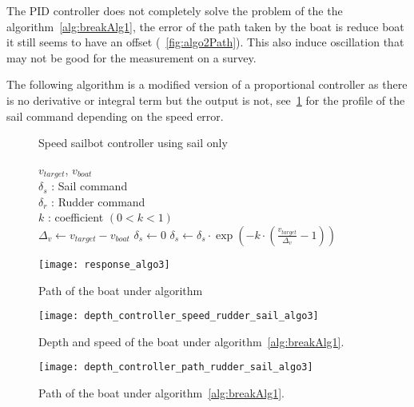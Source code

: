 The PID controller does not completely solve the problem of the the algorithm~\ref{alg:breakAlg1}, the error of the path taken by the boat is reduce boat  it still seems to have an offset (~\ref{fig:algo2Path}). This also induce oscillation that may not be good for the measurement on a survey.

The following algorithm is a modified version of a proportional controller as there is no derivative or integral term but the output is not, see~\ref{fig:responAlgo3} for the profile of the sail command depending on the speed error.

\begin{figure}[H]
\centering
    \begin{minipage}[b]{0.4\textwidth}
    \begin{algorithm}[H]
\caption{Speed sailbot controller using sail only}
\label{alg:breakAlg3}
\begin{algorithmic}[1]
\REQUIRE $v_{target}$, $v_{boat}$\\
   $\delta_s$ : Sail command\\
   $\delta_r$ : Rudder command\\
   $k$ : coefficient $(0< k <1)$\\
\STATE $\Delta_{v} \leftarrow v_{target} - v_{boat}$
\STATE $\delta_s \leftarrow 0$
\ELSE
\STATE $\delta_s \leftarrow \delta_s \cdot  \exp(-k \cdot (\frac{v_{target}}{\Delta_v}-1)) $
\ENDIF
\end{algorithmic}
\end{algorithm}
    \end{minipage}
    \hfill
    \begin{minipage}[b]{0.45\textwidth}
    \centering
    \texttt{[image: response\_algo3]}
    \caption{Path of the boat under algorithm}
    \label{fig:responAlgo3}
    \end{minipage}
\end{figure}




\begin{figure}[H]
\centering
    \begin{minipage}[b]{0.4\textwidth}
    \centering
    \texttt{[image: depth\_controller\_speed\_rudder\_sail\_algo3]}
    \caption{Depth and speed of the boat under algorithm~\ref{alg:breakAlg1}.}
    \label{fig: algo3Depth}
    \end{minipage}
    \hfill
    \begin{minipage}[b]{0.45\textwidth}
    \centering
    \texttt{[image: depth\_controller\_path\_rudder\_sail\_algo3]}
    \caption{Path of the boat under algorithm~\ref{alg:breakAlg1}.}
    \label{fig:algo1Path}
    \end{minipage}
\end{figure}

